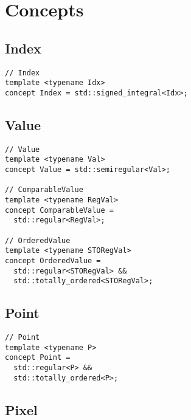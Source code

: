 \section{Concepts}

\subsection{Index}

\begin{verbatim}
// Index
template <typename Idx>
concept Index = std::signed_integral<Idx>;
\end{verbatim}


\subsection{Value}

\begin{verbatim}
// Value
template <typename Val>
concept Value = std::semiregular<Val>;

// ComparableValue
template <typename RegVal>
concept ComparableValue =
  std::regular<RegVal>;

// OrderedValue
template <typename STORegVal>
concept OrderedValue =
  std::regular<STORegVal> &&
  std::totally_ordered<STORegVal>;
\end{verbatim}


\subsection{Point}

\begin{verbatim}
// Point
template <typename P>
concept Point =
  std::regular<P> &&
  std::totally_ordered<P>;
\end{verbatim}


\subsection{Pixel}

